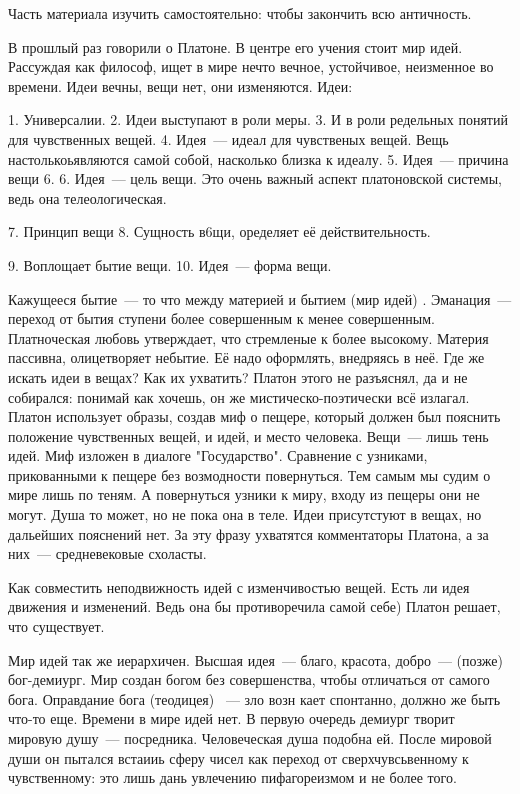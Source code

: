 
Часть материала изучить самостоятельно: чтобы закончить всю античность. 

В прошлый раз говорили о Платоне. В центре его учения стоит мир идей. Рассуждая как философ, ищет в мире нечто вечное, устойчивое, неизменное во времени. 
Идеи вечны, вещи нет, они изменяются. 
Идеи:

	1. Универсалии. 
	2. Идеи выступают в роли меры. 
	3. И в роли редельных понятий для чувственных вещей. 
	4. Идея~--- идеал для чувственых вещей. Вещь настолькоьявляются самой собой, насколько близка к идеалу. 
	5. Идея~--- причина вещи
	6. 6. Идея~--- цель вещи. Это очень важный аспект платоновской системы, ведь она телеологическая. 

	7. Принцип вещи
	8. Сущность в6щи, оределяет её действительность. 

	9. Воплощает бытие вещи. 
	10. Идея~--- форма вещи. 

Кажущееся бытие~--- то что между материей и бытием (мир идей) . 
Эманация~--- переход от бытия ступени более совершенным к менее совершенным. 
Платноческая любовь утверждает, что стремленые к более высокому. 
Материя пассивна, олицетворяет небытие. Её надо оформлять, внедряясь в неё. 
Где же искать идеи в вещах? Как их ухватить?
Платон этого не разъяснял, да и не собирался: понимай как хочешь, он же мистическо-поэтически всё излагал. Платон использует образы, создав миф о пещере, который должен был пояснить положение чувственных вещей, и идей, и место человека. 
Вещи~--- лишь тень идей. Миф изложен в диалоге "Государство". Сравнение с узниками, прикованными к пещере без возмодности повернуться. Тем самым мы судим о мире лишь по теням. 
А повернуться узники к миру, входу из пещеры они не могут. Душа то может, но не пока она в теле. 
Идеи присутстуют в вещах, но дальейших пояснений нет. За эту фразу ухватятся комментаторы Платона, а за них~--- средневековые схоласты. 

Как совместить неподвижность идей с изменчивостью вещей. Есть ли идея движения и изменений. Ведь она бы противоречила самой себе) Платон решает, что существует. 

Мир идей так же иерархичен. Высшая идея~--- благо, красота, добро~--- (позже) бог-демиург. Мир создан богом без совершенства, чтобы отличаться от самого бога. Оправдание бога (теодицея) ~--- зло возн кает спонтанно, должно же быть что-то еще. 
Времени в мире идей нет. В первую очередь демиург творит мировую душу~--- посредника. Человеческая душа подобна ей. 
После мировой души он пытался встаииь сферу чисел как переход от сверхчувсьвенному к чувственному: это лишь дань увлечению пифагореизмом и не более того. 

